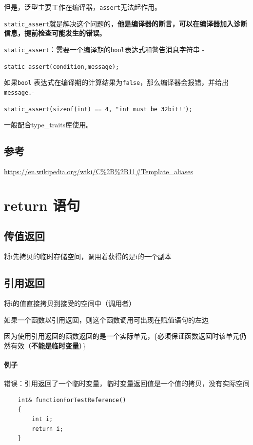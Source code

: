 \documentclass[UTF8,a4paper,12pt]{ctexbook} %
\begin{document}
			但是，泛型主要工作在编译器，\verb|assert|无法起作用。
			
			\verb|static_assert|就是解决这个问题的，\textbf{他是编译器的断言，可以在编译器加入诊断信息，提前检查可能发生的错误}。
			
			\verb|static_assert|：需要一个编译期的\verb|bool|表达式和警告消息字符串 - 
			
			\verb|static_assert(condition,message);|
			
			如果\verb|bool| 表达式在编译期的计算结果为\verb|false|，那么编译器会报错，并给出\verb|message.|-
			
			\verb|static_assert(sizeof(int) == 4, "int must be 32bit!");|
			
			一般配合type\_traits库使用。
	\section{参考}
		\url{https://en.wikipedia.org/wiki/C\%2B\%2B11\#Template_aliases}
			
\chapter{return 语句}           
 
 	\section{传值返回}将i先拷贝的临时存储空间，调用着获得的是i的一个副本
 		 
 	\section{引用返回}将i的值直接拷贝到接受的空间中（调用者）    
 		
	 		如果一个函数以引用返回，则这个函数调用可出现在赋值语句的左边
	 		
	 		因为使用引用返回的函数返回的是一个实际单元，\{必须保证函数返回时该单元仍然有效（\textbf{不能是临时变量}）\}
 		
 		\subsubsection{例子}
 		
	 		错误：引用返回了一个临时变量，临时变量返回值是一个值的拷贝，没有实际空间
	 		\begin{lstlisting}
	int& functionForTestReference()
	{
	 	int i;
		return i;
	}
	 		\end{lstlisting}
	 		
\end{document}
